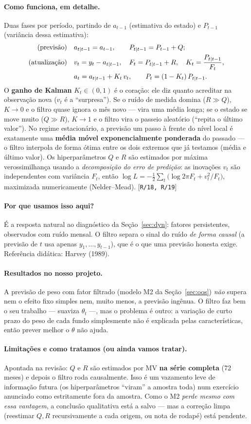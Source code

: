 \documentclass[11pt,a4paper]{article}
\newcommand{\porque}[0]{\paragraph{Por que usamos isso aqui?}}
\newcommand{\comofunciona}[0]{\paragraph{Como funciona, em detalhe.}}
\newcommand{\resultados}[0]{\paragraph{Resultados no nosso projeto.}}
\newcommand{\limitacoes}[0]{\paragraph{Limitações e como tratamos (ou ainda vamos tratar).}}
\newcommand{\scriptref}[1]{{\footnotesize\color{cinza}[\texttt{#1}]}}
\begin{document}
\comofunciona Duas fases por período, partindo de $a_{t-1}$ (estimativa do estado) e $P_{t-1}$
(variância dessa estimativa):
\begin{align}
\text{(previsão)}\quad & a_{t|t-1}=a_{t-1}, \qquad P_{t|t-1}=P_{t-1}+Q;\\
\text{(atualização)}\quad & v_t = y_t - a_{t|t-1}, \quad F_t = P_{t|t-1}+R, \quad
K_t = \frac{P_{t|t-1}}{F_t},\notag\\
& a_t = a_{t|t-1} + K_t\,v_t, \qquad P_t = (1-K_t)\,P_{t|t-1}.
\end{align}
O \textbf{ganho de Kalman} $K_t\in(0,1)$ é o coração: ele diz quanto acreditar na observação nova
($v_t$ é a ``surpresa''). Se o ruído de medida domina ($R\gg Q$), $K\to0$ e o filtro quase ignora
o mês novo --- vira uma média longa; se o estado se move muito ($Q\gg R$), $K\to1$ e o filtro vira
o passeio aleatório (``repita o último valor''). No regime estacionário, a previsão um passo à
frente do nível local é exatamente uma \textbf{média móvel exponencialmente ponderada} do passado
--- o filtro interpola de forma ótima entre os dois extremos que já testamos (média e último
valor). Os hiperparâmetros $Q$ e $R$ são estimados por máxima verossimilhança usando a
\emph{decomposição do erro de predição}: as inovações $v_t$ são independentes com variância
$F_t$, então $\log L = -\tfrac12\sum_t\big(\log 2\pi F_t + v_t^2/F_t\big)$, maximizada
numericamente (Nelder--Mead). \scriptref{R/18, R/19}

\porque É a resposta natural ao diagnóstico da Seção~\ref{sec:dyn}: fatores persistentes,
observados com ruído mensal. O filtro separa o sinal do ruído \emph{de forma causal} (a previsão
de $t$ usa apenas $y_1,\dots,y_{t-1}$), que é o que uma previsão honesta exige. Referência
didática: Harvey (1989).

\resultados A previsão de peso com fator filtrado (modelo M2 da Seção~\ref{sec:oos}) \emph{não}
supera nem o efeito fixo simples nem, muito menos, a previsão ingênua. O filtro faz bem o seu
trabalho --- suaviza $\theta_t$ ---, mas o problema é outro: a variação de curto prazo do peso de
cada fundo simplesmente não é explicada pelas características, então prever melhor o $\theta$
não ajuda.

\limitacoes Apontada na revisão: $Q$ e $R$ são estimados por MV \textbf{na série completa} (72
meses) e depois o filtro roda causalmente. Isso é um vazamento leve de informação futura (os
hiperparâmetros ``viram'' a amostra toda) num exercício anunciado como estritamente fora da
amostra. Como o M2 \emph{perde mesmo com essa vantagem}, a conclusão qualitativa está a salvo ---
mas a correção limpa (reestimar $Q,R$ recursivamente a cada origem, ou nota de rodapé) está
pendente.
\end{document}

